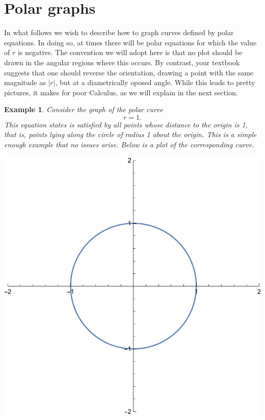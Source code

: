 \documentclass[11pt]{amsart}
\newtheorem{example}{Example}[section]
\numberwithin{equation}{section}
\begin{document}
\section{Polar graphs}
In what follows we wish to describe how to graph curves defined by polar equations. In doing so, at times there will be polar equations for which the value of $r$ is negative. The convention we will adopt here is that no plot should be drawn in the angular regions where this occurs. By contrast, your textbook suggests that one should reverse the orientation, drawing a point with the same magnitude as $|r|$, but at a diametrically oposed angle. While this leads to pretty pictures, it makes for poor Calculus, as we will explain in the next section. 

\begin{example}
Consider the graph of the polar curve 
\begin{equation*}
r = 1.
\end{equation*}
This equation states is satisfied by all points whose distance to the origin is 1, that is, points lying along the circle of radius 1 about the origin. This is a simple enough example that no issues arise. Below is a plot of the corresponding curve. 
\begin{center}
\includegraphics[scale=0.3]{polar_p1.pdf}
\end{center}
\end{example}
\end{document}
